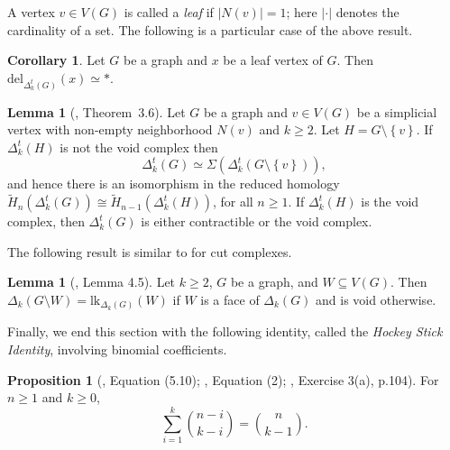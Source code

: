 \documentclass[11pt,reqno,a4paper]{amsart}
\theoremstyle{definition}
\theoremstyle{theorem}
\newtheorem{prop}[theorem]{Proposition}
\newtheorem{lemma}[theorem]{Lemma}
\newtheorem{corollary}[theorem]{Corollary}
\newcommand{\totalkcut}{\Delta_{k}^t}
\newcommand{\lno}{\left(}
\newcommand{\rno}{\right)}
\newcommand{\lcu}{\left\{}
\newcommand{\rcu}{\right\}}
\newcommand{\lk}{\mathrm{lk}}
\newcommand{\del}{\mathrm{del}}
\theoremstyle{remark}
\begin{document}
A vertex $v\in V(G)$ is called a \emph{leaf} if $|N(v)|=1$; here $|\cdot |$ denotes the cardinality of a set. The following is a particular case of the above result.
\begin{corollary}\label{coro: deletion of a vertex}
    Let $G$ be a graph and $x$ be a leaf vertex of $G$. Then $\del_{\totalkcut\lno G\rno}\lno x\rno \simeq *.$
\end{corollary}

\begin{lemma}[\cite{bayer2024total}, Theorem~3.6] \label{thm: suspension of previous graph}
    Let $G$ be a graph and $v \in V\lno G\rno$ be a simplicial vertex with non-empty neighborhood $N\lno v\rno$ and $k\geq2$. Let $H = G \setminus \lcu v \rcu$. If $\totalkcut\lno H \rno$ is not the void complex then
    $$ \totalkcut \lno G \rno \simeq \Sigma \lno \totalkcut \lno G \setminus \lcu v \rcu \rno\rno,$$
    and hence there is an isomorphism in the reduced homology $\tilde{H}_{n} \lno \totalkcut \lno G \rno \rno \cong \tilde{H}_{n-1} \lno \totalkcut \lno H \rno \rno$, for all $n \geq 1$.
    If $\totalkcut\lno H \rno$ is the void complex, then $\totalkcut\lno G \rno$ is either contractible or the void complex.
\end{lemma}

The following result is similar to  for cut complexes.
\begin{lemma}[\cite{bayer2024cut}, Lemma 4.5]\label{lemma:link for cut}
    Let $k \geq 2$, $G$ be a graph, and $W \subseteq V(G)$. Then $\Delta_k(G \setminus W) = \lk_{\Delta_k(G)}(W)$ if $W$ is a face of $\Delta_k(G)$ and is void otherwise.
\end{lemma}

Finally, we end this section with the following identity, called the \emph{Hockey Stick Identity}, involving binomial coefficients. 

\begin{prop} [\cite{graham94}, Equation (5.10); \cite{hockey}, Equation (2); \cite{StanleyenumerativeI}, Exercise 3(a), p.104] \label{prop: binomial result}
    For $n\geq 1$ and $k\geq 0$, $$\sum\limits_{i=1}^k \binom{n-i}{k-i} = \binom{n}{k-1}.$$
\end{prop}

\end{document}
